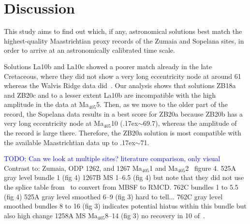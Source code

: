 \documentclass[draft]{agujournal2019}
\newcommand{\appr}{\raise.17ex\hbox{\(\scriptstyle\sim\)}} %
\newcommand{\ma}[1]{Ma\(_{405}\)#1} %
\newcommand{\ijk}{\textcolor{blue}}
\begin{document}
\section{Discussion}\label{sec:discussion}

This study aims to find out which, if any, astronomical solutions best match the highest-quality Maastrichtian proxy records of the Zumaia and Sopelana sites, in order to arrive at an astronomically calibrated time scale.



Solutions La10b and La10c showed a poorer match already in the late Cretaceous, where they did not show a very long eccentricity node at around \qty{61}{\millionyearago} whereas the Walvis Ridge data did~\cite{ZeebeLourens2022EPSL}.
Our analysis shows that solutions ZB18a and ZB20c and to a lesser extent La10b are incompatible with the high amplitude in the data at \ma{5}.
Then, as we move to the older part of the record, the Sopelana data results in a best score for ZB20a because ZB20b has a very long eccentricity node at \ma{10} (\appr\qty{69.7}{\millionyearago}), whereas the amplitude of the record is large there.
Therefore, the ZB20a solution is most compatible with the available Maastrichtian data up to \appr\qty{71}{\millionyearago}.

\ijk{TODO: Can we look at multiple sites? literature comparison, only visual}
Contrast to: Zumaia, ODP 1262, and 1267 \ma{1} and \ma{2}~\cite{Westerhold2008} figure 4.
525A gray level bundle 1 (fig 4)
1267B MS 1--6.5 (fig 4) but note that they did not use the splice table from~\cite{Westerhold2008} to convert from MBSF to RMCD.
762C bundles 1 to 5.5 (fig 4)
525A gray level smoothed 6--9 (fig 3) hard to tell...
762C gray level smoothed bundles 8 to 16 (fig 3) indicates potential hiatus within this bundle but also high change
1258A MS \ma{8--14} (fig 3) no recovery in 10
of~.
\end{document}
